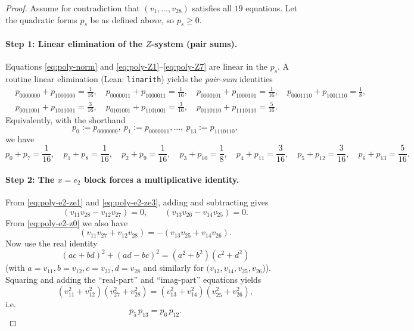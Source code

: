 \documentclass[11pt]{article}
\begin{document}
\begin{proof}
Assume for contradiction that $(v_1,\dots,v_{28})$ satisfies all $19$ equations.
Let the quadratic forms $p_s$ be as defined above, so $p_s\ge 0$.

\paragraph{Step 1: Linear elimination of the $Z$-system (pair sums).}
Equations \eqref{eq:poly-norm} and \eqref{eq:poly-Z1}--\eqref{eq:poly-Z7} are linear in the $p_s$.
A routine linear elimination (Lean: \texttt{linarith}) yields the \emph{pair-sum} identities
\begin{equation}
\label{eq:pairsums-v}
\begin{aligned}
&p_{0000000}+p_{1000000}=\frac{1}{16},\quad
p_{0000011}+p_{1000011}=\frac{1}{16},\quad
p_{0000101}+p_{1000101}=\frac{1}{16},\quad
p_{0001110}+p_{1001110}=\frac{1}{8},\\
&p_{0011001}+p_{1011001}=\frac{3}{16},\quad
p_{0101001}+p_{1101001}=\frac{3}{16},\quad
p_{0110110}+p_{1110110}=\frac{5}{16}.
\end{aligned}
\end{equation}
Equivalently, with the shorthand
\[
p_0:=p_{0000000},\ p_1:=p_{0000011},\dots,\ p_{13}:=p_{1110110},
\]
we have
\begin{equation}
\label{eq:pairsums-short}
p_0+p_7=\frac{1}{16},\quad p_1+p_8=\frac{1}{16},\quad p_2+p_9=\frac{1}{16},\quad p_3+p_{10}=\frac{1}{8},\quad
p_4+p_{11}=\frac{3}{16},\quad p_5+p_{12}=\frac{3}{16},\quad p_6+p_{13}=\frac{5}{16}.
\end{equation}

\paragraph{Step 2: The $x=e_2$ block forces a multiplicative identity.}
From \eqref{eq:poly-e2-ze1} and \eqref{eq:poly-e2-ze3}, adding and subtracting gives
\[
(v_{11}v_{28}-v_{12}v_{27})=0,\qquad (v_{13}v_{26}-v_{14}v_{25})=0.
\]
From \eqref{eq:poly-e2-z0} we also have
\[
(v_{11}v_{27}+v_{12}v_{28})=-(v_{13}v_{25}+v_{14}v_{26}).
\]
Now use the real identity
\[
(ac+bd)^2+(ad-bc)^2=(a^2+b^2)(c^2+d^2)
\]
(with $a=v_{11},b=v_{12},c=v_{27},d=v_{28}$ and similarly for $(v_{13},v_{14},v_{25},v_{26}$)).
Squaring and adding the ``real-part'' and ``imag-part'' equations yields
\[
(v_{11}^2+v_{12}^2)(v_{27}^2+v_{28}^2)=(v_{13}^2+v_{14}^2)(v_{25}^2+v_{26}^2),
\]
i.e.
\begin{equation}
\label{eq:mult-e2-v}
p_5\,p_{13}=p_6\,p_{12}.
\end{equation}


\end{proof}
\end{document}
